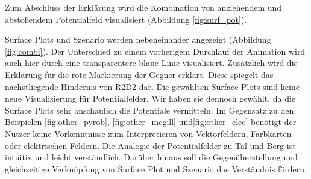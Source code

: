 Zum Abschluss der Erklärung wird die Kombination von anziehendem und abstoßendem Potentialfeld visualisiert (Abbildung \ref{fig:surf_pot}).

Surface Plots und Szenario werden nebeneinander angezeigt  (Abbildung \ref{fig:combi}).
Der Unterschied zu einem vorherigem Durchlauf der Animation wird auch hier durch eine transparentere blaue Linie visualisiert. Zusätzlich wird die Erklärung für die rote Markierung der Gegner erklärt. Diese spiegelt das nächstliegende Hindernis von R2D2 dar. 
Die gewählten Surface Plots sind keine neue Visualisierung für Potentialfelder. Wir haben sie dennoch gewählt, da die Surface Plots sehr anschaulich die Potentiale vermitteln. Im Gegensatz zu den Beispielen \ref{fig:other_pyrob}, \ref{fig:other_mcgill} und\ref{fig:other_elec} benötigt der Nutzer keine Vorkenntnisse zum Interpretieren von Vektorfeldern, Farbkarten oder elektrischen Feldern. Die Analogie der Potentialfelder zu Tal und Berg ist intuitiv und leicht verständlich.
Darüber hinaus soll die Gegenüberstellung und gleichzeitige Verknüpfung von Surface Plot und Szenario das Verständnis fördern.

